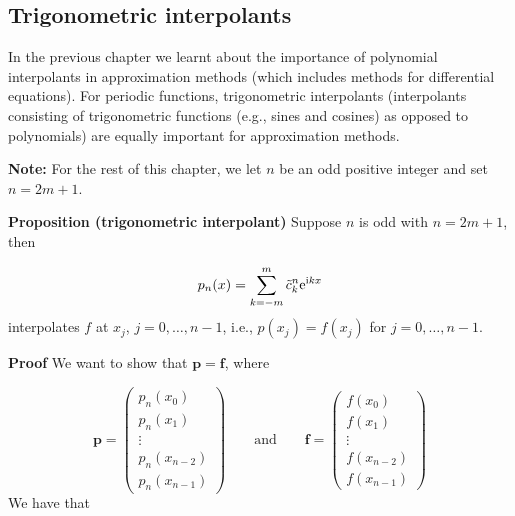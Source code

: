 \documentclass[12pt,a4paper]{article}
\begin{document}
\subsection{Trigonometric interpolants}
In the previous chapter we learnt about the importance of polynomial interpolants in approximation methods (which includes methods for differential equations).  For periodic functions, trigonometric interpolants (interpolants consisting of trigonometric functions (e.g., sines and cosines) as opposed to polynomials) are equally important for approximation methods.

\textbf{Note:} For the rest of this chapter, we let $n$ be an odd positive integer and set $n = 2m + 1$.

\textbf{Proposition (trigonometric interpolant)} Suppose $n$ is odd with $n = 2m+1$, then 

\[
p_n(x) = \sum_{k=-m}^{m}\tilde{c}^n_{k}{\rm e}^{{\rm i}kx}
\]
interpolates $f$ at $x_j$, $j = 0, \ldots, n-1$, i.e., $p(x_j) = f(x_j)$ for $j = 0, \ldots, n-1$.

\textbf{Proof}  We want to show that $\mathbf{p} = \mathbf{f}$, where 

\[
\mathbf{p} = \left(
\begin{array}{c}
p_n(x_0) \\
p_n(x_1) \\
\vdots \\
p_n(x_{n-2}) \\
p_n(x_{n-1})
\end{array}
\right) \qquad \text{and} \qquad 
\mathbf{f} = \left(
\begin{array}{c}
f(x_0) \\
f(x_1) \\
\vdots \\
f(x_{n-2}) \\
f(x_{n-1})
\end{array}
\right)
\]
We have that
\end{document}
